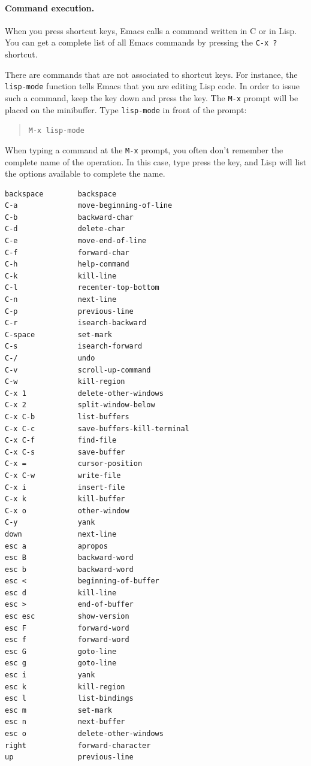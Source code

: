 \documentclass[a4paper,12pt]{book}
\begin{document}
\paragraph{Command execution.} When you press 
shortcut keys, Emacs calls a command written in
C or in Lisp. You can get a complete list of all
Emacs commands by pressing the \verb|C-x ?| shortcut.

There are commands that are not associated to
 shortcut keys. For instance, the \verb|lisp-mode|
function tells Emacs that you are editing Lisp code. 
In order to issue such a command, keep the 
key down and press the  key. The \verb|M-x|
prompt will be placed on the minibuffer. Type 
\verb|lisp-mode| in front of the prompt:
\begin{quote}
\verb|M-x lisp-mode|
\end{quote}
When typing a command at the \verb|M-x| prompt, you
often don't remember the complete name of the operation.
In this case, type press the  key, and Lisp will
list the options available to complete the name.

\begin{verbatim}
backspace        backspace
C-a              move-beginning-of-line
C-b              backward-char
C-d              delete-char
C-e              move-end-of-line
C-f              forward-char
C-h              help-command
C-k              kill-line
C-l              recenter-top-bottom
C-n              next-line
C-p              previous-line
C-r              isearch-backward
C-space          set-mark
C-s              isearch-forward
C-/              undo
C-v              scroll-up-command
C-w              kill-region
C-x 1            delete-other-windows
C-x 2            split-window-below
C-x C-b          list-buffers
C-x C-c          save-buffers-kill-terminal
C-x C-f          find-file
C-x C-s          save-buffer
C-x =            cursor-position
C-x C-w          write-file
C-x i            insert-file
C-x k            kill-buffer
C-x o            other-window
C-y              yank
down             next-line
esc a            apropos
esc B            backward-word
esc b            backward-word
esc <            beginning-of-buffer
esc d            kill-line
esc >            end-of-buffer
esc esc          show-version
esc F            forward-word
esc f            forward-word
esc G            goto-line
esc g            goto-line
esc i            yank
esc k            kill-region
esc l            list-bindings
esc m            set-mark
esc n            next-buffer
esc o            delete-other-windows
right            forward-character
up               previous-line
\end{verbatim}
\end{document}
